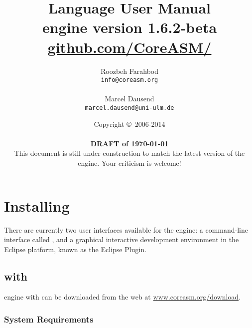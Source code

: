 \documentclass{article}
\newcommand{\version}{1.6.2-beta}
\newcommand{\copyrightNotice}[1]{{Copyright \copyright\ #1}}
\renewcommand{\url}[1]{\href{http://#1}{{\ttfamily #1}}}
\begin{document}
\title{\huge \CoreASM Language User Manual \\ {\Large engine version \version} \\ {\large \url{github.com/CoreASM/}}}

\author{Roozbeh Farahbod \\ \texttt{info@coreasm.org}\\\\Marcel Dausend \\ \texttt{marcel.dausend@uni-ulm.de}}  

\date{\copyrightNotice{2006-2014} \\~\\ {\bf DRAFT of \today} \\ {This document is still under construction to match the latest version of the engine. Your criticism is welcome!}}

 \maketitle

\newpage
\tableofcontents
\newpage

\PScommands

\section{Installing \CoreASM}

There are currently two user interfaces available for the \CoreASM engine: a
command-line interface called \Carma, and a graphical interactive
development environment in the Eclipse platform, known as the \CoreASM Eclipse
Plugin.


\subsection{\CoreASM with \Carma}

\CoreASM engine with \Carma can be downloaded from the web at \url{www.coreasm.org/download}.


\subsubsection{System Requirements}
\end{document}
